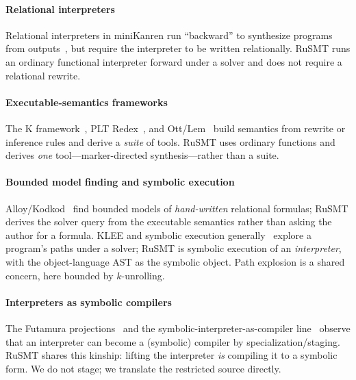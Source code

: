 \documentclass[sigplan,review,anonymous]{acmart}
\theoremstyle{definition}
\theoremstyle{remark}
\newcommand{\rusmt}{RuSMT}
\begin{document}
\paragraph{Relational interpreters}
Relational interpreters in miniKanren run ``backward'' to synthesize programs from
outputs~\cite{byrd2017unified,byrd2012quines}, but require the interpreter to be
written relationally. \rusmt{} runs an ordinary functional interpreter forward
under a solver and does not require a relational rewrite.

\paragraph{Executable-semantics frameworks}
The K framework~\cite{rosu2010k}, PLT Redex~\cite{felleisen2009redex}, and
Ott/Lem~\cite{sewell2007ott,mulligan2014lem} build semantics from rewrite or
inference rules and derive a \emph{suite} of tools. \rusmt{} uses ordinary
functions and derives \emph{one} tool---marker-directed synthesis---rather than a
suite.

\paragraph{Bounded model finding and symbolic execution}
Alloy/Kodkod~\cite{jackson2002alloy,torlak2007kodkod} find bounded models of
\emph{hand-written} relational formulas; \rusmt{} derives the solver query from the
executable semantics rather than asking the author for a formula. KLEE and
symbolic execution generally~\cite{cadar2008klee} explore a program's paths under a
solver; \rusmt{} is symbolic execution of an \emph{interpreter}, with the
object-language AST as the symbolic object. Path explosion is a shared concern,
here bounded by $k$-unrolling.

\paragraph{Interpreters as symbolic compilers}
The Futamura projections~\cite{futamura1999partial} and the
symbolic-interpreter-as-compiler line~\cite{wei2020gensym} observe that an
interpreter can become a (symbolic) compiler by specialization/staging. \rusmt{}
shares this kinship: lifting the interpreter \emph{is} compiling it to a symbolic
form. We do not stage; we translate the restricted source directly.
\end{document}
